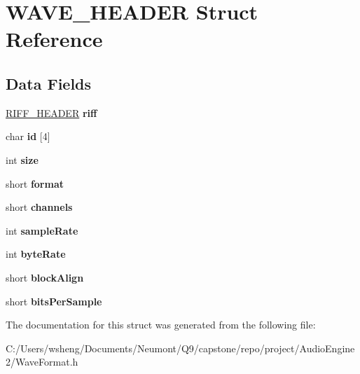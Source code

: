 \hypertarget{struct_w_a_v_e___h_e_a_d_e_r}{}\section{W\+A\+V\+E\+\_\+\+H\+E\+A\+D\+ER Struct Reference}
\label{struct_w_a_v_e___h_e_a_d_e_r}
\subsection*{Data Fields}
\begin{DoxyCompactItemize}
\item 
\mbox{\label{struct_w_a_v_e___h_e_a_d_e_r_a524dc3c9956cd78e865aa8d2cfdaa8c9}} 
\hyperlink{struct_r_i_f_f___h_e_a_d_e_r}{R\+I\+F\+F\+\_\+\+H\+E\+A\+D\+ER} {\bfseries riff}
\item 
\mbox{\label{struct_w_a_v_e___h_e_a_d_e_r_ace593da5319500315498c8f845ee2368}} 
char {\bfseries id} \mbox{[}4\mbox{]}
\item 
\mbox{\label{struct_w_a_v_e___h_e_a_d_e_r_a439227feff9d7f55384e8780cfc2eb82}} 
int {\bfseries size}
\item 
\mbox{\label{struct_w_a_v_e___h_e_a_d_e_r_aeab9b72b1df0720f0ef946977652f179}} 
short {\bfseries format}
\item 
\mbox{\label{struct_w_a_v_e___h_e_a_d_e_r_a1e38a396fcc69677b5a1924620ef442b}} 
short {\bfseries channels}
\item 
\mbox{\label{struct_w_a_v_e___h_e_a_d_e_r_ad16762d495115c2606417076f062c39d}} 
int {\bfseries sample\+Rate}
\item 
\mbox{\label{struct_w_a_v_e___h_e_a_d_e_r_af2ea76dfafa123c5da6237684020c9ff}} 
int {\bfseries byte\+Rate}
\item 
\mbox{\label{struct_w_a_v_e___h_e_a_d_e_r_a9258a1a7eee2eae6bdf83d3d79c65b12}} 
short {\bfseries block\+Align}
\item 
\mbox{\label{struct_w_a_v_e___h_e_a_d_e_r_a4023651570f95bcb579ccae8530ca853}} 
short {\bfseries bits\+Per\+Sample}
\end{DoxyCompactItemize}


The documentation for this struct was generated from the following file\+:\begin{DoxyCompactItemize}
\item 
C\+:/\+Users/wsheng/\+Documents/\+Neumont/\+Q9/capstone/repo/project/\+Audio\+Engine2/Wave\+Format.\+h\end{DoxyCompactItemize}
